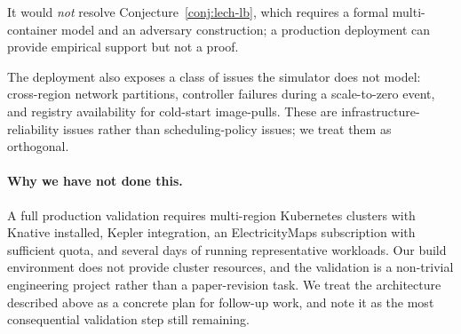 It would \emph{not} resolve Conjecture~\ref{conj:lech-lb}, which
requires a formal multi-container model and an adversary
construction; a production deployment can provide empirical support
but not a proof.

The deployment also exposes a class of issues the simulator does not
model: cross-region network partitions, controller failures during a
scale-to-zero event, and registry availability for cold-start
image-pulls. These are infrastructure-reliability issues rather than
scheduling-policy issues; we treat them as orthogonal.

\paragraph{Why we have not done this.}
A full production validation requires multi-region Kubernetes
clusters with Knative installed, Kepler integration, an
ElectricityMaps subscription with sufficient quota, and several
days of running representative workloads. Our build environment does
not provide cluster resources, and the validation is a non-trivial
engineering project rather than a paper-revision task. We treat the
architecture described above as a concrete plan for follow-up work,
and note it as the most consequential validation step still
remaining.
